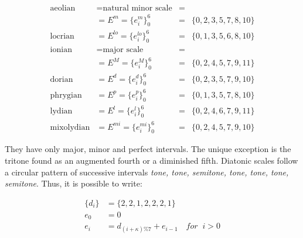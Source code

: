 \begin{equation}\label{eq:escalas}
\begin{aligned}
	\text{aeolian}    & = \text{natural minor scale}  & = & \\
			  & = E^m = \{e_i^m\}_0^6       & = & \{0,2,3,5,7,8,10\} \\
	\text{locrian}    & = E^{lo} = \{e_i^{lo}\}_0^6 & = & \{0,1,3,5,6,8,10\} \\ 
	\text{ionian}     & = \text{major scale}          & = &  \\
			  & = E^M = \{e_i^M\}_0^6       & = & \{0,2,4,5,7,9,11\} \\
	\text{dorian}     & = E^{d} = \{e_i^{d}\}_0^6   & = & \{0,2,3,5,7,9,10\} \\
	\text{phrygian}   & = E^{p} = \{e_i^{p}\}_0^6   & = & \{0,1,3,5,7,8,10\} \\
	\text{lydian}     & = E^{l}=\{e_i^{l}\}_0^6     & = & \{0,2,4,6,7,9,11\} \\
	\text{mixolydian} & = E^{mi} = \{e_i^{mi}\}_0^6 & = & \{0,2,4,5,7,9,10\}
\end{aligned}
\end{equation}

\noindent They have only major, minor and perfect intervals.
The unique exception is the tritone found as an augmented fourth or a diminished fifth.
Diatonic scales follow a circular pattern of successive intervals \textit{tone, tone, semitone, tone, tone, tone, semitone}. Thus, it is possible to write:

\begin{equation}\label{eq:relacaoDia}
\begin{split}
\{d_i\} & =\{2,2,1,2,2,2,1\} \\
e_0 & =0 \\
e_i & =d_{(i+\kappa)\%7}+e_{i-1} \quad for \;\;  i > 0
\end{split}
\end{equation}

